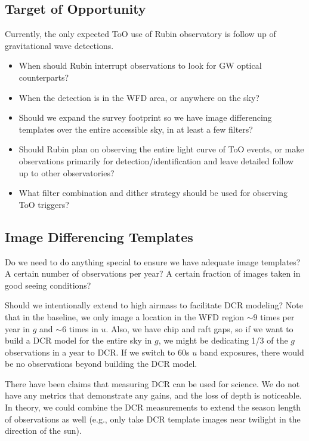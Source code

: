 \subsection{Target of Opportunity}

Currently, the only expected ToO use of Rubin observatory is follow up of gravitational wave detections.

\begin{itemize}
    \item{When should Rubin interrupt observations to look for GW optical counterparts?}
    \item{When the detection is in the WFD area, or anywhere on the sky?}
    \item{Should we expand the survey footprint so we have image differencing templates over the entire accessible sky, in at least a few filters?}
    \item{Should Rubin plan on observing the entire light curve of ToO events, or make observations primarily for detection/identification and leave detailed follow up to other observatories?}
    \item{What filter combination and dither strategy should be used for observing ToO triggers?} 
\end{itemize}


\subsection{Image Differencing Templates}

Do we need to do anything special to ensure we have adequate image templates? A certain number of observations per year? A certain fraction of images taken in good seeing conditions?

Should we intentionally extend to high airmass to facilitate DCR modeling? Note that in the baseline, we only image a location in the WFD region $\sim$9 times per year in $g$ and $\sim$6 times in $u$. Also, we have chip and raft gaps, so if we want to build a DCR model for the entire sky in $g$, we might be dedicating 1/3 of the $g$ observations in a year to DCR. If we switch to 60s $u$ band exposures, there would be no observations beyond building the DCR model. 

There have been claims that measuring DCR can be used for science.  We do not have any metrics that demonstrate any gains, and the loss of depth is noticeable. In theory, we could combine the DCR measurements to extend the season length of observations as well (e.g., only take DCR template images near twilight in the direction of the sun).

